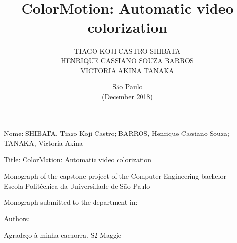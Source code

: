 \documentclass[12pt,openright,oneside,a4paper,english]{abntex2}
\author{TIAGO KOJI CASTRO SHIBATA\\
HENRIQUE CASSIANO SOUZA BARROS\\
VICTORIA AKINA TANAKA}
\title{ColorMotion: Automatic video colorization}
\date{São Paulo\\(December 2018)}
\begin{document}
\begin{otherlanguage}{english}

\imprimircapa
\imprimirfalsafolhaderosto
\imprimirfolhaderosto

\begin{folhadeaprovacao}
\noindent
Nome: SHIBATA, Tiago Koji Castro; BARROS, Henrique Cassiano Souza; TANAKA, Victoria Akina

\noindent
Title: ColorMotion: Automatic video colorization

\vspace{1cm}
\hspace{.2\textwidth} %
\begin{minipage}{.75\textwidth}
    \begin{sloppypar}
        Monograph of the capstone project of the Computer Engineering bachelor - Escola Politécnica da Universidade de São Paulo \\[0.3cm]
    \end{sloppypar}
\end{minipage}

\noindent
Monograph submitted to the department in: \\

\begin{center}
Authors:
\end{center}

\hspace{5cm}
\hspace{5cm}
\hspace{5cm}

\end{folhadeaprovacao}

\begin{agradecimentos}
Agradeço à minha cachorra. S2 Maggie

\end{agradecimentos}

\begin{epigrafe}
\begin{flushright}
\vspace*{\fill}


\end{flushright}
\end{epigrafe}
\end{otherlanguage}
\end{document}
